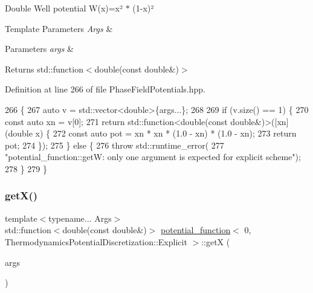 Double Well potential W(x)=x² $\ast$ (1-\/x)² 


\begin{DoxyTemplParams}{Template Parameters}
{\em Args} & \\
\hline
\end{DoxyTemplParams}

\begin{DoxyParams}{Parameters}
{\em args} & \\
\hline
\end{DoxyParams}
\begin{DoxyReturn}{Returns}
std\+::function$<$double(const double\&)$>$ 
\end{DoxyReturn}


Definition at line 266 of file Phase\+Field\+Potentials.\+hpp.


\begin{DoxyCode}
266                                                         \{
267     \textcolor{keyword}{auto} v = std::vector<double>\{args...\};
268 
269     \textcolor{keywordflow}{if} (v.size() == 1) \{
270       \textcolor{keyword}{const} \textcolor{keyword}{auto} xn = v[0];
271       \textcolor{keywordflow}{return} std::function<double(const double&)>([xn](\textcolor{keywordtype}{double} x) \{
272         \textcolor{keyword}{const} \textcolor{keyword}{auto} pot = xn * xn * (1.0 - xn) * (1.0 - xn);
273         \textcolor{keywordflow}{return} pot;
274       \});
275     \} \textcolor{keywordflow}{else} \{
276       \textcolor{keywordflow}{throw} std::runtime\_error(
277           \textcolor{stringliteral}{"potential\_function::getW: only one argument is expected for explicit scheme"});
278     \}
279   \}
\end{DoxyCode}
\mbox{\label{structpotential__function_3_010_00_01ThermodynamicsPotentialDiscretization_1_1Explicit_01_4_a47e7aead8ac26c18694091e060c480e9}} 
\subsubsection{\texorpdfstring{get\+X()}{getX()}}
{\footnotesize\ttfamily template$<$typename... Args$>$ \\
std\+::function$<$double(const double\&)$>$ \hyperlink{structpotential__function}{potential\+\_\+function}$<$ 0, Thermodynamics\+Potential\+Discretization\+::\+Explicit $>$\+::getX (\begin{DoxyParamCaption}\item[{Args...}]{args }\end{DoxyParamCaption})\hspace{0.3cm}{\ttfamily [inline]}}



